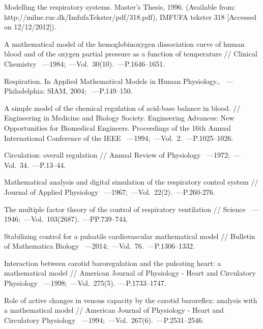 \begin{thebibliography}{}
     Modelling the respiratory systems. Master’s Thesis, 1996. (Available from: http://milne.ruc.dk/ImfufaTekster/pdf/318.pdf), IMFUFA tekster 318 [Accessed on 12/12/2012]).
    
     A mathematical model of the hemoglobinoxygen
dissociation curve of human blood and of the oxygen partial pressure as a function of temperature  // Clinical Chemistry ~---1984;~---Vol.~30(10).~---P.1646–1651.

     Respiration. In Applied Mathematical Models in Human Physiology., ~---Philadelphia:  SIAM, 2004; ~---P.149–150.

     A simple model of the chemical regulation of acid-base balance in
blood.  // Engineering in Medicine and Biology Society. Engineering Advances: New Opportunities for Biomedical
Engineers. Proceedings of the 16th Annual International Conference of the IEEE ~---1994;~---Vol.~2.~---P.1025–1026.

     Circulation: overall regulation  // Annual Review of Physiology ~---1972;~---Vol.~34.~---P.13–44.
    
     Mathematical analysis and digital simulation of the respiratory control system  // Journal
of Applied Physiology ~---1967;~---Vol.~22(2).~---P.260-276.

     The multiple factor theory of the control of respiratory ventilation  // Science ~---1946;~---Vol.~103(2687).~---PP.739–744.
    
     Stabilizing control for a pulsatile cardiovascular mathematical model  // Bulletin
of Mathematica Biology ~---2014;~---Vol.~76.~---P.1306–1332.

     Interaction between carotid baroregulation and the pulsating heart: a mathematical model // American
Journal of Physiology - Heart and Circulatory Physiology ~---1998;~---Vol.~275(5).~---P.1733–1747.

     Role of active changes in venous capacity by the carotid baroreflex:
analysis with a mathematical model // American Journal of Physiology - Heart and Circulatory Physiology ~---1994;~---Vol.~267(6).~---P.2531–2546.


\end{thebibliography}

